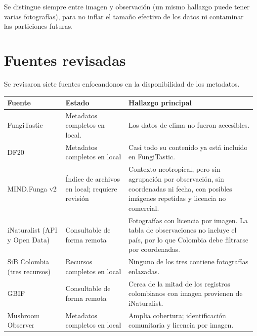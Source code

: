 \documentclass[11pt,a4paper]{article}
\begin{document}
Se distingue siempre entre imagen y observación (un mismo
hallazgo puede tener varias fotografías), para no inflar el tamaño efectivo de
los datos ni contaminar las particiones futuras.

\section{Fuentes revisadas}

Se revisaron siete fuentes enfocandonos en la disponibilidad de los metadatos.

\begin{table}[ht]
\centering
\small
\begin{tabularx}{\textwidth}{
>{\raggedright\arraybackslash}p{3.1cm}
>{\raggedright\arraybackslash}p{3.6cm}
Y}
\toprule
\textbf{Fuente} &
\textbf{Estado} &
\textbf{Hallazgo principal}\\
\midrule

FungiTastic &
Metadatos completos en local. &
Los datos de clima no fueron accesibles.\\

DF20 &
Metadatos completos en local &
Casi todo su contenido ya está incluido en FungiTastic.\\

MIND.Funga v2 &
Índice de archivos en local; requiere revisión &
Contexto neotropical, pero sin agrupación por observación, sin coordenadas ni
fecha, con posibles imágenes repetidas y licencia no comercial.\\

iNaturalist (API y Open Data) &
Consultable de forma remota &
Fotografías con licencia por imagen. La tabla de observaciones no incluye el
país, por lo que Colombia debe filtrarse por coordenadas.\\

SiB Colombia (tres recursos) &
Recursos completos en local &
Ninguno de los tres contiene fotografías enlazadas.\\

GBIF &
Consultable de forma remota &
Cerca de la mitad de los registros colombianos con imagen provienen de
iNaturalist.\\

Mushroom Observer &
Metadatos completos en local &
Amplia cobertura; identificación comunitaria y licencia por imagen.\\

\bottomrule
\end{tabularx}
\end{table}
\end{document}
